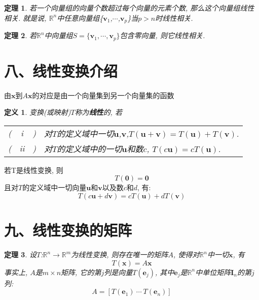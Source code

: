 \documentclass[UTF8,fontset=ubuntu]{ctexart}
\theoremstyle{plain}
\newtheorem{theorem}{定理}
\theoremstyle{nonumberplain}
\newtheorem{definition}{定义}
\theoremstyle{empty}
\begin{document}
\begin{theorem}
若一个向量组的向量个数超过每个向量的元素个数, 那么这个向量组线性相关. 就是说, $\mathbb{R}^n$中任意向量组\{$\bm{v}_1$,$\cdots$,$\bm{v}_p$\}当$p>n$时线性相关.
\end{theorem}\vspace{4ex}

\begin{theorem}
若$\mathbb{R}^n$中向量组$S=\{\bm{v}_1,\cdots,\bm{v}_p\}$包含零向量, 则它线性相关.
\end{theorem}\vspace{4ex}

\section{八、线性变换介绍}
由$\bm{x}$到$A\bm{x}$的对应是由一个向量集到另一个向量集的函数\\[2ex]

\begin{definition}
变换(或映射)$T$称为\textbf{线性}的, 若\\
\begin{tabular}{l@{}c@{}l@{}l}
( & i & ) & 对$T$的定义域中一切$\bm{u}$,$\bm{v}$,$T(\bm{u}+\bm{v})=T(\bm{u})+T(\bm{v})$.\\
( & ii & ) & 对$T$的定义域中的一切$\bm{u}$和数$c$, $T(c\bm{u})=cT(\bm{u})$.
\end{tabular}
\end{definition}\vspace{4ex}

\begin{law}
若T是线性变换, 则
\[T(\bm{0})=\bm{0}\]
且对$T$的定义域中一切向量$\bm{u}$和$\bm{v}$以及数$c$和$d$, 有:
\[T(c\bm{u}+d\bm{v})=cT(\bm{u})+dT(\bm{v})\]
\end{law}\vspace{6ex}

\section{九、线性变换的矩阵}
\begin{theorem}
设$T$:$\mathbb{R}^n\rightarrow\mathbb{R}^m$为线性变换, 则存在唯一的矩阵$A$, 使得对$\mathbb{R}^n$中一切$\bm{x}$, 有
\[T(\bm{x})=A\bm{x}\]
事实上, $A$是$m\times n$矩阵, 它的第$j$列是向量$T(\bm{e}_j)$, 其中$\bm{e}_j$是$\mathbb{R}^n$中单位矩阵$\bm{I}_n$的第$j$列:
\[A=[T(\bm{e}_1)\ \cdots\ T(\bm{e}_n)]\]
\end{theorem}\vspace{4ex}
\end{document}
